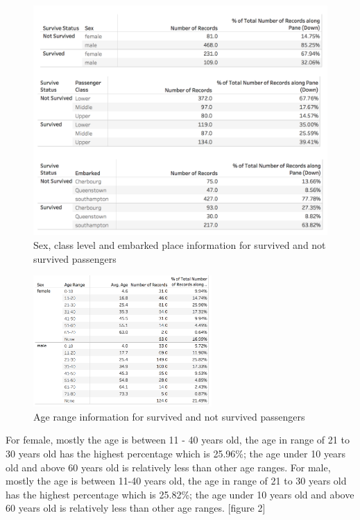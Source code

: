 \documentclass[10pt, a4paper, twocolumn]{article} %
\begin{document}
\begin{figure}
	\includegraphics[width=\linewidth]{1.png} %
	\caption{Sex, class level and embarked place information for survived and not survived passengers} %
\end{figure}

\begin{figure}[h]
\includegraphics[width=\linewidth, height=5cm, right]{2.png} %
\caption{Age range information for survived and not survived passengers} %
\label{bear} %
\end{figure}

For female, mostly the age is between 11 - 40 years old, the age in range of 21 to 30 years old has the highest percentage which is 25.96\%; the age under 10 years old and above 60 years old is relatively less than other age ranges. 
For male, mostly the age is between 11-40 years old, the age in range of 21 to 30 years old has the highest percentage which is 25.82\%;  the age under 10 years old and above 60 years old is relatively less than other age ranges. [figure 2]
\end{document}
